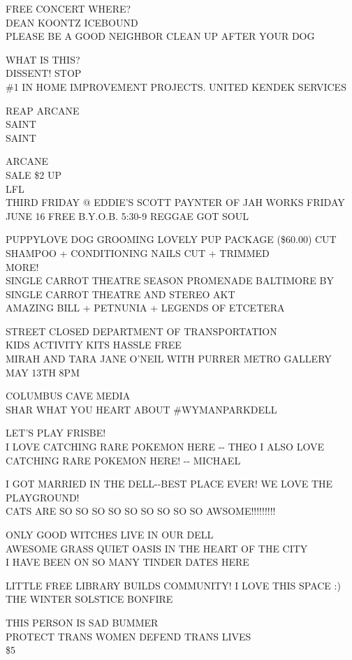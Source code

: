 \documentclass[10pt,letterpaper]{article}
\begin{document}
FREE CONCERT WHERE?\\
DEAN KOONTZ ICEBOUND\\
PLEASE BE A GOOD NEIGHBOR CLEAN UP AFTER YOUR DOG

WHAT IS THIS?\\
DISSENT! STOP\\
\#1 IN HOME IMPROVEMENT PROJECTS.  UNITED KENDEK SERVICES

REAP ARCANE\\
SAINT\\
SAINT

ARCANE\\
SALE \$2 UP\\
LFL\\
THIRD FRIDAY @ EDDIE'S SCOTT PAYNTER OF JAH WORKS FRIDAY JUNE 16 FREE B.Y.O.B. 5:30{-}9 REGGAE GOT SOUL

PUPPYLOVE DOG GROOMING LOVELY PUP PACKAGE (\$60.00) CUT SHAMPOO + CONDITIONING NAILS CUT + TRIMMED\\
MORE!\\
SINGLE CARROT THEATRE SEASON PROMENADE BALTIMORE BY SINGLE CARROT THEATRE AND STEREO AKT\\
AMAZING BILL + PETNUNIA + LEGENDS OF ETCETERA

STREET CLOSED DEPARTMENT OF TRANSPORTATION\\
KIDS ACTIVITY KITS HASSLE FREE\\
MIRAH AND TARA JANE O'NEIL WITH PURRER METRO GALLERY MAY 13TH 8PM

COLUMBUS CAVE MEDIA\\
SHAR WHAT YOU HEART ABOUT \#WYMANPARKDELL

LET'S PLAY FRISBE!\\
I LOVE CATCHING RARE POKEMON HERE {-}{-} THEO  I ALSO LOVE CATCHING RARE POKEMON HERE!  {-}{-} MICHAEL

I GOT MARRIED IN THE DELL{-}{-}BEST PLACE EVER!  WE LOVE THE PLAYGROUND!\\
CATS ARE SO SO SO SO SO SO SO SO SO AWSOME!!!!!!!!!

ONLY GOOD WITCHES LIVE IN OUR DELL\\
AWESOME GRASS QUIET OASIS IN THE HEART OF THE CITY\\
I HAVE BEEN ON SO MANY TINDER DATES HERE

LITTLE FREE LIBRARY BUILDS COMMUNITY!  I LOVE THIS SPACE :)\\
THE WINTER SOLSTICE BONFIRE

THIS PERSON IS SAD BUMMER\\
PROTECT TRANS WOMEN DEFEND TRANS LIVES\\
\$5
\end{document}

